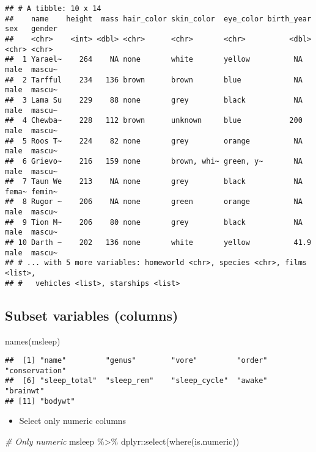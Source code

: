 \documentclass[
]{book}
\newenvironment{Shaded}{\begin{snugshade}}{\end{snugshade}}
\newcommand{\CommentTok}[1]{\textcolor[rgb]{0.56,0.35,0.01}{\textit{#1}}}
\newcommand{\FunctionTok}[1]{\textcolor[rgb]{0.00,0.00,0.00}{#1}}
\newcommand{\NormalTok}[1]{#1}
\newcommand{\SpecialCharTok}[1]{\textcolor[rgb]{0.00,0.00,0.00}{#1}}
\providecommand{\tightlist}{%
  \setlength{\itemsep}{0pt}\setlength{\parskip}{0pt}}
\begin{document}
\begin{verbatim}
## # A tibble: 10 x 14
##    name    height  mass hair_color skin_color  eye_color birth_year sex   gender
##    <chr>    <int> <dbl> <chr>      <chr>       <chr>          <dbl> <chr> <chr> 
##  1 Yarael~    264    NA none       white       yellow          NA   male  mascu~
##  2 Tarfful    234   136 brown      brown       blue            NA   male  mascu~
##  3 Lama Su    229    88 none       grey        black           NA   male  mascu~
##  4 Chewba~    228   112 brown      unknown     blue           200   male  mascu~
##  5 Roos T~    224    82 none       grey        orange          NA   male  mascu~
##  6 Grievo~    216   159 none       brown, whi~ green, y~       NA   male  mascu~
##  7 Taun We    213    NA none       grey        black           NA   fema~ femin~
##  8 Rugor ~    206    NA none       green       orange          NA   male  mascu~
##  9 Tion M~    206    80 none       grey        black           NA   male  mascu~
## 10 Darth ~    202   136 none       white       yellow          41.9 male  mascu~
## # ... with 5 more variables: homeworld <chr>, species <chr>, films <list>,
## #   vehicles <list>, starships <list>
\end{verbatim}

\hypertarget{subset-variables-columns}{%
\subsection{Subset variables (columns)}\label{subset-variables-columns}}

\begin{Shaded}
\begin{Highlighting}[]
\FunctionTok{names}\NormalTok{(msleep)}
\end{Highlighting}
\end{Shaded}

\begin{verbatim}
##  [1] "name"         "genus"        "vore"         "order"        "conservation"
##  [6] "sleep_total"  "sleep_rem"    "sleep_cycle"  "awake"        "brainwt"     
## [11] "bodywt"
\end{verbatim}

\begin{itemize}
\tightlist
\item
  Select only numeric columns
\end{itemize}

\begin{Shaded}
\begin{Highlighting}[]
\CommentTok{\# Only numeric}
\NormalTok{msleep }\SpecialCharTok{\%\textgreater{}\%}
\NormalTok{  dplyr}\SpecialCharTok{::}\FunctionTok{select}\NormalTok{(}\FunctionTok{where}\NormalTok{(is.numeric))}
\end{Highlighting}
\end{Shaded}
\end{document}
